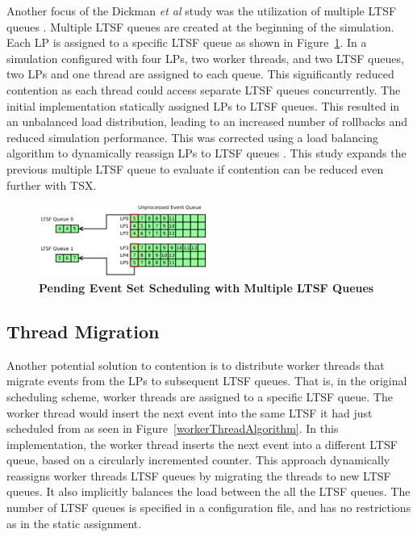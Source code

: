 \documentclass{sig-alternate}
\begin{document}
Another focus of the Dickman \emph{et al} study was the utilization of multiple LTSF
queues \cite{dickman}.  Multiple LTSF queues are created at the beginning of the
simulation.  Each LP is assigned to a specific LTSF queue as shown in
Figure~\ref{fig:multipleLTSF}.  In a simulation configured with four LPs, two worker
threads, and two LTSF queues, two LPs and one thread are assigned to each queue.  This
significantly reduced contention as each thread could access separate LTSF queues
concurrently.  The initial implementation statically assigned LPs to LTSF queues.  This
resulted in an unbalanced load distribution, leading to an increased number of rollbacks
and reduced simulation performance.  This was corrected using a load balancing algorithm
to dynamically reassign LPs to LTSF queues \cite{dickman}.  This study expands the
previous multiple LTSF queue to evaluate if contention can be reduced even further with
TSX.

\begin{figure}
    \centering
    \graphicspath{ {./figures/} }
    \includegraphics[width=0.5\textwidth,keepaspectratio]{multiple_ltsf}
    \caption{\textbf{Pending Event Set Scheduling with Multiple LTSF
        Queues}}\label{fig:multipleLTSF}
\end{figure}

\subsection{Thread Migration}

Another potential solution to contention is to distribute worker threads that migrate
events from the LPs to subsequent LTSF queues.  That is, in the original scheduling
scheme, worker threads are assigned to a specific LTSF queue.  The worker thread would
insert the next event into the same LTSF it had just scheduled from as seen in
Figure~\ref{workerThreadAlgorithm}.  In this implementation, the worker thread inserts the
next event into a different LTSF queue, based on a circularly incremented counter.  This
approach dynamically reassigns worker threads LTSF queues by migrating the threads to new
LTSF queues.  It also implicitly balances the load between the all the LTSF queues.  The
number of LTSF queues is specified in a configuration file, and has no restrictions as in
the static assignment.
\end{document}
